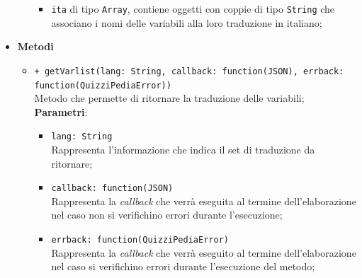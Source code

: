 \begin{itemize}
\begin{itemize}
\begin{itemize}
						\item \texttt{ita} di tipo \texttt{Array}, contiene oggetti con coppie di tipo \texttt{String} che associano i nomi delle variabili alla loro traduzione in italiano;
					\end{itemize}
			\end{itemize}
		\item \textbf{Metodi}
			\begin{itemize}
				\item \texttt{+ getVarlist(lang: String, callback: function(JSON), errback: function(QuizziPediaError))} \\
				Metodo che permette di ritornare la traduzione delle variabili; \\
				\textbf{Parametri}:
					\begin{itemize}
						\item \texttt{lang: String} \\
						Rappresenta l'informazione che indica il set di traduzione da ritornare;
						\item \texttt{callback: function(JSON)} \\
						Rappresenta la \textit{callback} che verrà eseguita al termine dell'elaborazione nel caso non si verifichino errori durante l'esecuzione;
						\item \texttt{errback: function(QuizziPediaError)} \\
						Rappresenta la \textit{callback} che verrà eseguito al termine dell'elaborazione nel caso si verifichino errori durante l'esecuzione del metodo;
					\end{itemize}
			\end{itemize}
	\end{itemize}
	